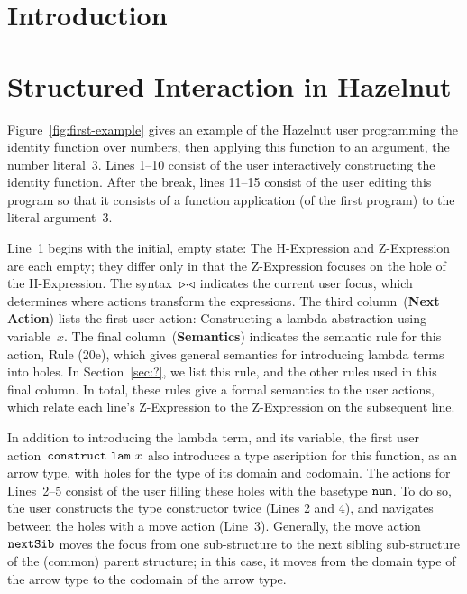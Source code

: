 \documentclass{llncs}
\begin{document}
\section{Introduction}
%


\section{Structured Interaction in Hazelnut}
\label{sec:example}
%
Figure~\ref{fig:first-example} gives an example of the Hazelnut user
programming the identity function over numbers, then applying this
function to an argument, the number literal~3.
%
Lines 1--10 consist of the user interactively constructing the
identity function.
%
After the break, lines 11--15 consist of the user editing this program
so that it consists of a function application (of the first program)
to the literal argument~3.

Line~1 begins with the initial, empty state: The H-Expression and
Z-Expression are each empty; they differ only in that the Z-Expression
focuses on the hole of the H-Expression.
%
The syntax~${\triangleright}{\cdot}{\triangleleft}$ indicates the current user focus, which
determines where actions transform the expressions.
%
The third column~(\textbf{Next Action}) lists the first user action:
Constructing a lambda abstraction using variable~$x$.
%
The final column~(\textbf{Semantics}) indicates the semantic rule for
this action, Rule (20e), which gives general semantics for introducing
lambda terms into holes.
%
In Section~\ref{sec:?}, we list this rule, and the other rules used in
this final column. In total, these rules give a formal semantics to
the user actions, which relate each line's Z-Expression to the
Z-Expression on the subsequent line.

In addition to introducing the lambda term, and its variable, the
first user action~$\mathtt{construct}~\mathtt{lam}~x$ also introduces a type
ascription for this function, as an arrow type, with holes for the
type of its domain and codomain.
%
The actions for Lines~2--5 consist of the user filling these holes
with the basetype $\texttt{num}{}$.
%
To do so, the user constructs the type constructor twice (Lines 2 and
4), and navigates between the holes with a move action (Line~3).
%
Generally, the move action~$\mathtt{nextSib}$ moves the focus from one
sub-structure to the next sibling sub-structure of the (common) parent
structure; in this case, it moves from the domain type of the arrow
type to the codomain of the arrow type.
%
\end{document}
